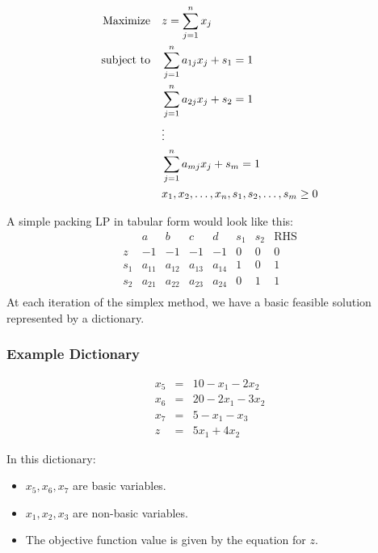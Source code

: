   \begin{align}
    \text{Maximize} \quad & z = \sum_{j=1}^{n} x_j \notag \\
    \text{subject to} \quad & \sum_{j=1}^{n} a_{1j} x_j + s_1 = 1 \notag \\
    & \sum_{j=1}^{n} a_{2j} x_j + s_2 = 1 \notag \\
    & \vdots \notag \\
    & \sum_{j=1}^{n} a_{mj} x_j + s_m = 1 \label{LP_Problem} \\
    & x_1, x_2, \dots, x_n, s_1, s_2, \dots, s_m \geq 0 \notag
\end{align}



  A simple packing LP in tabular form would look like this:
  \begin{equation*}
      \begin{array}{ccccccc|c}
        & a & b & c & d & s_1 & s_2 & \text{RHS} \\
        \hline
        z & -1 & -1 & -1 & -1 & 0 & 0 & 0 \\
        \hline
        s_1 & a_{11} & a_{12} & a_{13} & a_{14} & 1 & 0 & 1 \\
        s_2 & a_{21} & a_{22}& a_{23} & a_{24}& 0 & 1 & 1\\
      \end{array}
  \end{equation*}
At each iteration of the simplex method, 
we have a basic feasible solution represented by a dictionary.

\subsubsection{Example Dictionary}

\[
\begin{array}{lcl}
    x_5 & = & 10 - x_1 - 2x_2 \\
    x_6 & = & 20 - 2x_1 - 3x_2 \\
    x_7 & = & 5 - x_1 - x_3 \\
    z & = & 5x_1 + 4x_2
\end{array}
\]

In this dictionary:
\begin{itemize}
    \item \(x_5, x_6, x_7\) are basic variables.
    \item \(x_1, x_2, x_3\) are non-basic variables.
    \item The objective function value is given by the equation for \(z\).
\end{itemize}

